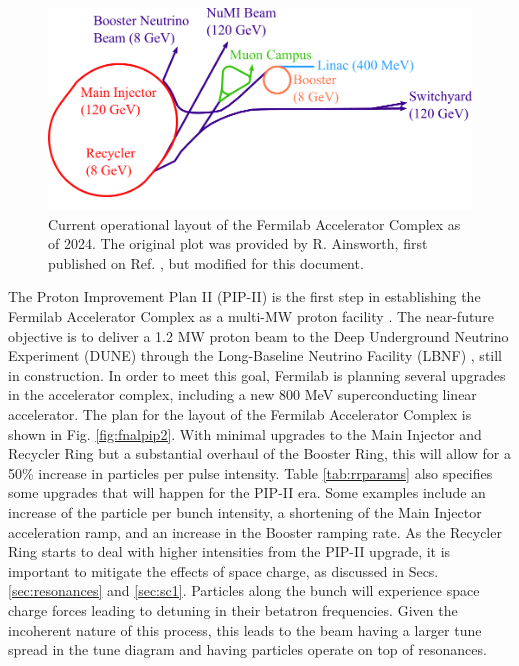 \begin{figure}[H]
   \centering
   \includegraphics[width=\columnwidth]{chapter3/complex_noTev.png}
   \caption{Current operational layout of the Fermilab Accelerator Complex as of 2024. The original plot was provided by R. Ainsworth, first published on Ref. \cite{rr1}, but modified for this document.}
   \label{fig:fnal}
\end{figure}

The Proton Improvement Plan II (PIP-II) is the first step in establishing the Fermilab Accelerator Complex as a multi-MW proton facility \cite{pipII1}. The near-future objective is to deliver a 1.2 MW proton beam to the Deep Underground Neutrino Experiment (DUNE) through the Long-Baseline Neutrino Facility (LBNF) \cite{dune}, still in construction. In order to meet this goal, Fermilab is planning several upgrades in the accelerator complex, including a new 800 MeV superconducting linear accelerator. The plan for the layout of the Fermilab Accelerator Complex is shown in Fig. \ref{fig:fnalpip2}. With minimal upgrades to the Main Injector and Recycler Ring but a substantial overhaul of the Booster Ring, this will allow for a 50\% increase in particles per pulse intensity. Table \ref{tab:rrparams} also specifies some upgrades that will happen for the PIP-II era. Some examples include an increase of the particle per bunch intensity, a shortening of the Main Injector acceleration ramp, and an increase in the Booster ramping rate. As the Recycler Ring starts to deal with higher intensities from the PIP-II upgrade, it is important to mitigate the effects of space charge, as discussed in Secs. \ref{sec:resonances} and \ref{sec:sc1}. Particles along the bunch will experience space charge forces leading to detuning in their betatron frequencies. Given the incoherent nature of this process, this leads to the beam having a larger tune spread in the tune diagram and having particles operate on top of resonances.

